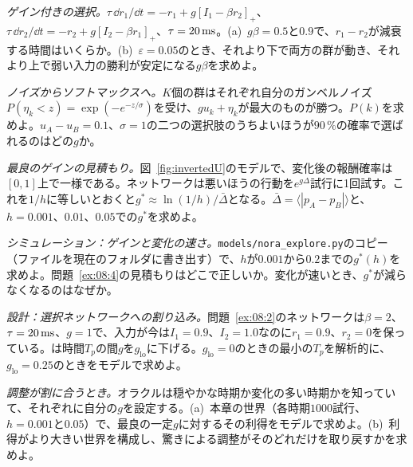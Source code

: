 \begin{exercise}[\lvlB]
\label{ex:08:2}
\emph{ゲイン付きの選択。}$\tau\,\dd r_1/\dd t=-r_1+g[I_1-\beta r_2]_+$、$\tau\,\dd r_2/\dd t=-r_2+g[I_2-\beta r_1]_+$、$\tau=20\,\text{ms}$。(a)~$g\beta=0.5$と$0.9$で、$r_1-r_2$が減衰する時間はいくらか。(b)~$\varepsilon=0.05$のとき、それより下で両方の群が動き、それより上で弱い入力の勝利が安定になる$g\beta$を求めよ。
\end{exercise}

\begin{exercise}[\lvlA]
\label{ex:08:3}
\emph{ノイズからソフトマックスへ。}$K$個の群はそれぞれ自分のガンベルノイズ$P(\eta_k<z)=\exp(-e^{-z/\sigma})$を受け、$gu_k+\eta_k$が最大のものが勝つ。$P(k)$を求めよ。$u_A-u_B=0.1$、$\sigma=1$の二つの選択肢のうちよいほうが$90\,\%$の確率で選ばれるのはどの$g$か。
\end{exercise}

\begin{exercise}[\lvlB]
\label{ex:08:4}
\emph{最良のゲインの見積もり。}図~\ref{fig:invertedU}のモデルで、変化後の報酬確率は$[0,1]$上で一様である。ネットワークは悪いほうの行動を$e^{g\Delta}$試行に1回試す。これを$1/h$に等しいとおくと$g^*\approx\ln(1/h)/\bar\Delta$となる。$\bar\Delta=\langle|p_A-p_B|\rangle$と、$h=0.001$、$0.01$、$0.05$での$g^*$を求めよ。
\end{exercise}

\begin{exercise}[\lvlB]
\label{ex:08:5}
\emph{シミュレーション：ゲインと変化の速さ。}\texttt{models/\allowbreak nora\_explore.py}のコピー（ファイルを現在のフォルダに書き出す）で、$h$が$0.001$から$0.2$までの$g^*(h)$を求めよ。問題~\ref{ex:08:4}の見積もりはどこで正しいか。変化が速いとき、$g^*$が減らなくなるのはなぜか。
\end{exercise}

\begin{exercise}[\lvlB]
\label{ex:08:6}
\emph{設計：選択ネットワークへの割り込み。}問題~\ref{ex:08:2}のネットワークは$\beta=2$、$\tau=20\,\text{ms}$、$g=1$で、入力が今は$I_1=0.9$、$I_2=1.0$なのに$r_1=0.9$、$r_2=0$を保っている。は時間$T_p$の間$g$を$g_{\text{lo}}$に下げる。$g_{\text{lo}}=0$のときの最小の$T_p$を解析的に、$g_{\text{lo}}=0.25$のときをモデルで求めよ。
\end{exercise}

\begin{exercise}[\lvlC]
\label{ex:08:7}
\emph{調整が割に合うとき。}オラクルは穏やかな時期か変化の多い時期かを知っていて、それぞれに自分の$g$を設定する。(a)~本章の世界（各時期$1000$試行、$h=0.001$と$0.05$）で、最良の一定$g$に対するその利得をモデルで求めよ。(b)~利得がより大きい世界を構成し、驚きによる調整がそのどれだけを取り戻すかを求めよ。
\end{exercise}
